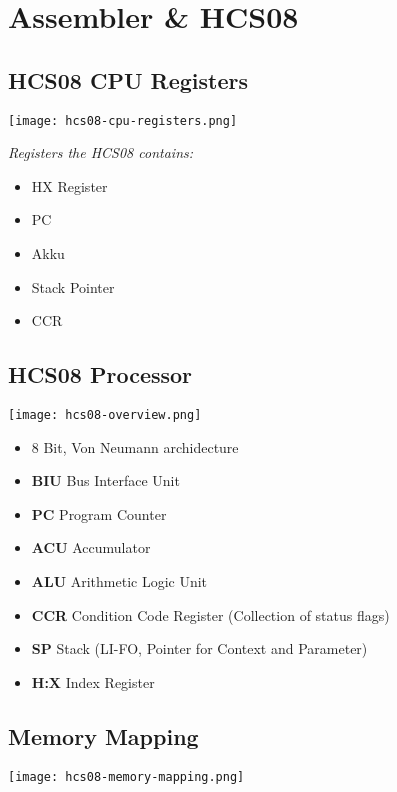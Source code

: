 \section{Assembler \& HCS08}

\subsection{HCS08 CPU Registers}

\texttt{[image: hcs08-cpu-registers.png]}

\textit{
    Registers the HCS08 contains:
}

\begin{itemize}
    \item{HX Register}
    \item{PC}
    \item{Akku}
    \item{Stack Pointer}
    \item{CCR}
\end{itemize}

\subsection{HCS08 Processor}

\texttt{[image: hcs08-overview.png]}

\begin{itemize}
    \item{8 Bit, Von Neumann archidecture}
    \item{\textbf{BIU} Bus Interface Unit}
    \item{\textbf{PC} Program Counter}
    \item{\textbf{ACU} Accumulator}
    \item{\textbf{ALU} Arithmetic Logic Unit}
    \item{\textbf{CCR} Condition Code Register (Collection of status flags)}
    \item{\textbf{SP} Stack (LI-FO, Pointer for Context and Parameter)}
    \item{\textbf{H:X} Index Register}
\end{itemize}

\subsection{Memory Mapping}

\texttt{[image: hcs08-memory-mapping.png]}

